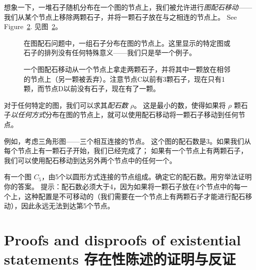 想象一下，一堆石子随机分布在一个图的节点上，我们被允许进行\emph{图配石移动}——我们从某个节点上移除两颗石子，并将一颗石子放在与之相连的节点上。
See Figure~\ref{fig:pebbling_move}.
见图~\ref{fig:pebbling_move}。

\begin{figure}[!hbtp]
      \begin{center}
            
      \end{center}
      \caption[图配石]{在图配石问题中，一组石子分布在图的节点上。这里显示的特定图或石子的排列没有任何特殊意义——我们只是举一个例子。}
      \label{fig:pebbling}
\end{figure}

\begin{figure}[!hbtp]
      \begin{center}
            
      \end{center}
      \caption[图配石移动]{一个图配石移动从一个节点上拿走两颗石子，并将其中一颗放在相邻的节点上（另一颗被丢弃）。注意节点C以前有3颗石子，现在只有1颗，而节点D以前没有石子，现在有了一颗。}
      \label{fig:pebbling_move}
\end{figure}

对于任何特定的图，我们可以求其\emph{配石数} $\rho$。
这是最小的数，使得如果将 $\rho$ 颗石子{\em 以任何方式}分布在图的节点上，就可以使用配石移动将一颗石子移动到任何节点。

例如，考虑三角形图——三个相互连接的节点。
这个图的配石数是3。如果我们从每个节点上有一颗石子开始，我们已经完成了；
如果有一个节点上有两颗石子，我们可以使用配石移动到达另外两个节点中的任何一个。

\begin{exer}     
      有一个图 $C_5$，由5个以圆形方式连接的节点组成。确定它的配石数。用穷举法证明你的答案。
      提示：配石数必须大于4，因为如果将一颗石子放在4个节点中的每一个上，这种配置是不可移动的（我们需要在一个节点上有两颗石子才能进行配石移动），因此永远无法到达第5个节点。
\end{exer}

\clearpage





\newpage


\section[Existential statements 存在性陈述]{Proofs and disproofs of existential statements 存在性陈述的证明与反证}
\label{sec:exist}

